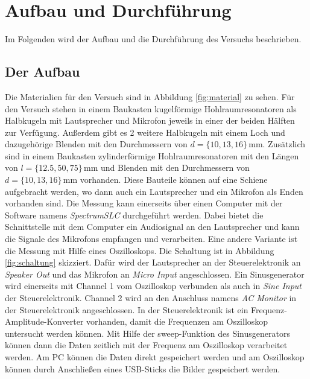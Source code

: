 \section{Aufbau und Durchführung}
\label{sec:auf_durch}

Im Folgenden wird der Aufbau und die Durchführung des Versuchs beschrieben.

\subsection{Der Aufbau}
\label{sec:aufbau}

Die Materialien für den Versuch sind in Abbildung \ref{fig:material} zu sehen. Für den Versuch stehen in einem Baukasten kugelförmige Hohlraumresonatoren als Halbkugeln mit Lautsprecher und Mikrofon jeweils in einer der beiden Hälften zur Verfügung. Außerdem gibt es 2 weitere Halbkugeln mit einem Loch und dazugehörige Blenden mit den Durchmessern von $d = \{ 10, 13, 16 \} \, \mathrm{mm}$. Zusätzlich sind in einem Baukasten zylinderförmige Hohlraumresonatoren mit den Längen von $l = \{12.5, 50, 75\} \, \mathrm{mm}$ und Blenden mit den Durchmessern von $d = \{ 10, 13, 16 \} \, \mathrm{mm}$ vorhanden. Diese Bauteile können auf eine Schiene aufgebracht werden, wo dann auch ein Lautsprecher und ein Mikrofon als Enden vorhanden sind. Die Messung kann einerseits über einen Computer mit der Software namens \textit{SpectrumSLC} durchgeführt werden. Dabei bietet die Schnittstelle mit dem Computer ein Audiosignal an den Lautsprecher und kann die Signale des Mikrofons empfangen und verarbeiten. Eine andere Variante ist die Messung mit Hilfe eines Oszilloskops. Die Schaltung ist in Abbildung \ref{fig:schaltung} skizziert. Dafür wird der Lautsprecher an der Steuerelektronik an \textit{Speaker Out} und das Mikrofon an \textit{Micro Input} angeschlossen. Ein Sinusgenerator wird einerseits mit Channel 1 vom Oszilloskop verbunden als auch in \textit{Sine Input} der Steuerelektronik. Channel 2 wird an den Anschluss namens \textit{AC Monitor} in der Steuerelektronik angeschlossen. In der Steuerelektronik ist ein Frequenz-Amplitude-Konverter vorhanden, damit die Frequenzen am Oszilloskop untersucht werden können. Mit Hilfe der sweep-Funktion des Sinusgenerators können dann die Daten zeitlich mit der Frequenz am Oszilloskop verarbeitet werden. Am PC können die Daten direkt gespeichert werden und am Oszilloskop können durch Anschließen eines USB-Sticks die Bilder gespeichert werden.

